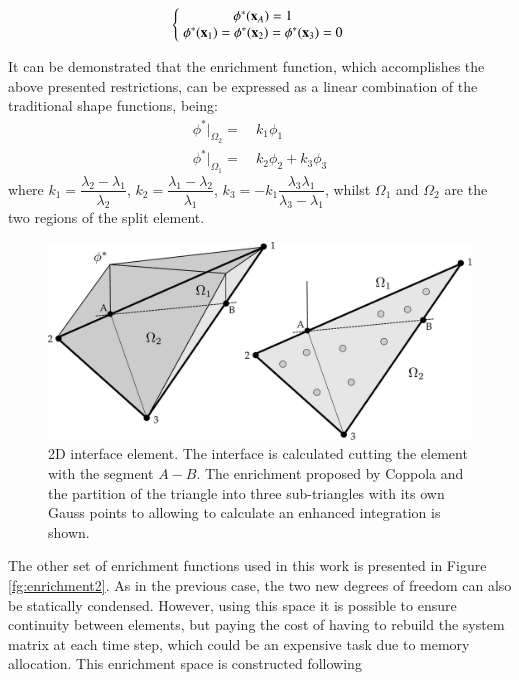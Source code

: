 \begin{equation}
   \left\{\;
   \begin{matrix}
      \phi^*(\mathbf{x}_A)= 1 \\
      \phi^*(\mathbf{x}_1)= \phi^*(\mathbf{x}_2)=\phi^*(\mathbf{x}_3)= 0
   \end{matrix}\;
   \right.
   \label{eq:enrich-1a}
\end{equation}

It can be demonstrated\cite{Coppola05} that the enrichment function, which accomplishes the above presented restrictions, can be expressed as a linear combination of the traditional shape functions, being:
 \begin{align}
    \phi^*|_{\Omega_2} = & \ k_1 \phi_1 \label{phi_enrichment-2}\\
    \phi^*|_{\Omega_1} = & \ k_2 \phi_2 + k_3 \phi_3 \label{phi_enrichment-1}
  \end{align}
where $k_1 = \dfrac{\lambda_2-\lambda_1}{\lambda_2}$, $k_2 = \dfrac{\lambda_1-\lambda_2}{\lambda_1}$, $k_3 = -k_1\dfrac{\lambda_3\lambda_1}{\lambda_3-\lambda_1}$, whilst $\Omega_1$ and $\Omega_2$ are the two regions of the split element.

\begin{figure}[H]
  \centering
  \includegraphics[width=.9\columnwidth]{images/enrichment1.pdf}
   \caption{2D interface element. The interface is calculated cutting the element with the segment $A-B$. The enrichment proposed by Coppola and the partition of the triangle into three sub-triangles with its own Gauss points to allowing to calculate an enhanced integration is shown.}
   \label{fg:enrichment1}                %
\end{figure}

The other set of enrichment functions used in this work is presented in Figure \ref{fg:enrichment2}. As in the previous case, the two new degrees of freedom can also be statically condensed. However, using this space it is possible to ensure continuity between elements, but paying the cost of having to rebuild the system matrix at each time step, which could be an expensive task due to memory allocation.
This enrichment space is constructed following

